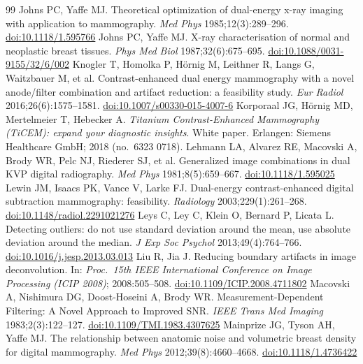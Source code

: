 \documentclass[11pt,a4paper]{article}
\begin{document}
\begin{thebibliography}{99}
 Johns PC, Yaffe MJ. Theoretical optimization of dual-energy x-ray imaging with application to mammography. \emph{Med Phys} 1985;12(3):289--296. \href{https://doi.org/10.1118/1.595766}{doi:10.1118/1.595766}
 Johns PC, Yaffe MJ. X-ray characterisation of normal and neoplastic breast tissues. \emph{Phys Med Biol} 1987;32(6):675--695. \href{https://doi.org/10.1088/0031-9155/32/6/002}{doi:10.1088/0031-9155/32/6/002}
 Knogler T, Homolka P, Hörnig M, Leithner R, Langs G, Waitzbauer M, et al. Contrast-enhanced dual energy mammography with a novel anode/filter combination and artifact reduction: a feasibility study. \emph{Eur Radiol} 2016;26(6):1575--1581. \href{https://doi.org/10.1007/s00330-015-4007-6}{doi:10.1007/s00330-015-4007-6}
 Korporaal JG, H\"ornig MD, Mertelmeier T, Hebecker A. \emph{Titanium Contrast-Enhanced Mammography (TiCEM): expand your diagnostic insights}. White paper. Erlangen: Siemens Healthcare GmbH; 2018 (no.\ 6323 0718).
 Lehmann LA, Alvarez RE, Macovski A, Brody WR, Pelc NJ, Riederer SJ, et al. Generalized image combinations in dual KVP digital radiography. \emph{Med Phys} 1981;8(5):659--667. \href{https://doi.org/10.1118/1.595025}{doi:10.1118/1.595025}
 Lewin JM, Isaacs PK, Vance V, Larke FJ. Dual-energy contrast-enhanced digital subtraction mammography: feasibility. \emph{Radiology} 2003;229(1):261--268. \href{https://doi.org/10.1148/radiol.2291021276}{doi:10.1148/radiol.2291021276}
 Leys C, Ley C, Klein O, Bernard P, Licata L. Detecting outliers: do not use standard deviation around the mean, use absolute deviation around the median. \emph{J Exp Soc Psychol} 2013;49(4):764--766. \href{https://doi.org/10.1016/j.jesp.2013.03.013}{doi:10.1016/j.jesp.2013.03.013}
 Liu R, Jia J. Reducing boundary artifacts in image deconvolution. In: \emph{Proc.\ 15th IEEE International Conference on Image Processing (ICIP 2008)}; 2008:505--508. \href{https://doi.org/10.1109/ICIP.2008.4711802}{doi:10.1109/ICIP.2008.4711802}
 Macovski A, Nishimura DG, Doost-Hoseini A, Brody WR. Measurement-Dependent Filtering: A Novel Approach to Improved SNR. \emph{IEEE Trans Med Imaging} 1983;2(3):122--127. \href{https://doi.org/10.1109/TMI.1983.4307625}{doi:10.1109/TMI.1983.4307625}
 Mainprize JG, Tyson AH, Yaffe MJ. The relationship between anatomic noise and volumetric breast density for digital mammography. \emph{Med Phys} 2012;39(8):4660--4668. \href{https://doi.org/10.1118/1.4736422}{doi:10.1118/1.4736422}

\end{thebibliography}
\end{document}

